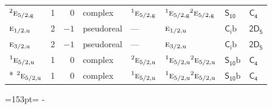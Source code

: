 \documentclass[10pt,a4paper]{article}
\newcommand{\needspace}[1]{\par\penalty-100\begingroup\dimen0=#1\relax\dimen2=\pagegoal
  \advance\dimen2-\pagetotal\ifdim\dimen0>\dimen2\relax\ifdim\dimen2>0pt\vfil\break\fi\fi
  \endgroup}
\numberwithin{equation}{section}
\newcommand{\grp}[1]{\mathsf{#1}}
\newcommand{\irr}[1]{\text{\normalfont\scshape #1}}
\newcommand{\conjpair}[1]{{}^{#1}}
\newcommand{\ptag}[1]{\mathrm{#1}}
\newcommand{\secondclass}{\mathrm{b}}
\begin{document}
{\begin{longtable}{@{}lrrlllll@{}}
$\conjpair{2}\irr{e}_{5/2,\ptag{g}}$ & 1 & $0$ & complex & $\conjpair{1}\irr{e}_{5/2,\ptag{g}}$ & $\conjpair{1}\irr{e}_{5/2,\ptag{g}}\conjpair{2}\irr{e}_{5/2,\ptag{g}}$ & \href{S10.pdf}{$\grp{S_{10}}$} & \href{../../../rotation/data/pdf/C4.pdf}{$\grp{C_{4}}$}\\
$\irr{e}_{1/2,\ptag{u}}$ & 2 & $-1$ & pseudoreal & --- & $\irr{e}_{1/2,\ptag{u}}$ & \href{S2b.pdf}{$\grp{C_{i}}\secondclass$} & \href{2D5.pdf}{$\grp{2D_{5}}$}\\
$\irr{e}_{3/2,\ptag{u}}$ & 2 & $-1$ & pseudoreal & --- & $\irr{e}_{3/2,\ptag{u}}$ & \href{S2b.pdf}{$\grp{C_{i}}\secondclass$} & \href{2D5.pdf}{$\grp{2D_{5}}$}\\
$\conjpair{1}\irr{e}_{5/2,\ptag{u}}$ & 1 & $0$ & complex & $\conjpair{2}\irr{e}_{5/2,\ptag{u}}$ & $\conjpair{1}\irr{e}_{5/2,\ptag{u}}\conjpair{2}\irr{e}_{5/2,\ptag{u}}$ & \href{S10b.pdf}{$\grp{S_{10}}\secondclass$} & \href{../../../rotation/data/pdf/C4.pdf}{$\grp{C_{4}}$}\\*
$\conjpair{2}\irr{e}_{5/2,\ptag{u}}$ & 1 & $0$ & complex & $\conjpair{1}\irr{e}_{5/2,\ptag{u}}$ & $\conjpair{1}\irr{e}_{5/2,\ptag{u}}\conjpair{2}\irr{e}_{5/2,\ptag{u}}$ & \href{S10b.pdf}{$\grp{S_{10}}\secondclass$} & \href{../../../rotation/data/pdf/C4.pdf}{$\grp{C_{4}}$}\\
\bottomrule\end{longtable}}
\needspace{153pt}
\end{document}
